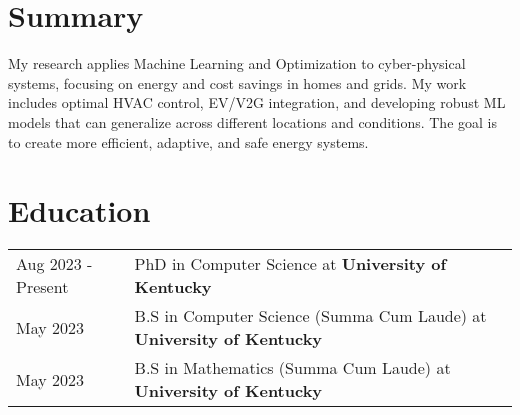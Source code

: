 \documentclass[a4paper,12pt]{article}
\begin{document}
\section{Summary}
My research applies Machine Learning and Optimization to cyber-physical systems, focusing on energy and cost savings in homes and grids. 
My work includes optimal HVAC control, EV/V2G integration, and developing robust ML models that can generalize across different locations and conditions. 
The goal is to create more efficient, adaptive, and safe energy systems.


\section{Education}
\begin{tabularx}{\linewidth}{@{}l X@{}}	
Aug 2023 - Present & PhD in Computer Science at \textbf{University of Kentucky} \\ %
May 2023 & B.S in Computer Science (Summa Cum Laude) at \textbf{University of Kentucky} \\ %
May 2023 & B.S in Mathematics (Summa Cum Laude) at \textbf{University of Kentucky} \\ %
\end{tabularx}

\end{document}
